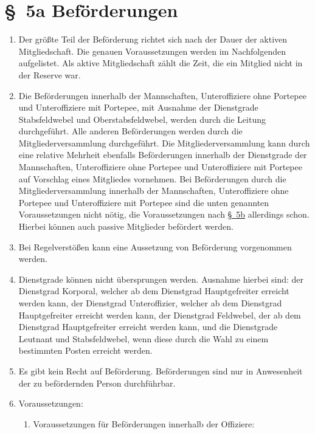 \newpage
\section*{\S~5a Beförderungen}
\label{sec:befroerderungen}
\begin{enumerate}[label=(\arabic*)]
    \item Der größte Teil der Beförderung richtet sich nach der Dauer der aktiven Mitgliedschaft. Die genauen Voraussetzungen werden im Nachfolgenden aufgelistet. Als aktive Mitgliedschaft zählt die Zeit, die ein Mitglied nicht in der Reserve war.    
    \item Die Beförderungen innerhalb der Mannschaften, Unteroffiziere ohne Portepee und Unteroffiziere mit Portepee, mit Ausnahme der Dienstgrade Stabsfeldwebel und Oberstabsfeldwebel, werden durch die Leitung durchgeführt. Alle anderen Beförderungen werden durch die Mitgliederversammlung durchgeführt. Die Mitgliederversammlung kann durch eine relative Mehrheit ebenfalls Beförderungen innerhalb der Dienstgrade der Mannschaften, Unteroffiziere ohne Portepee und Unteroffiziere mit Portepee auf Vorschlag eines Mitgliedes vornehmen. Bei Beförderungen durch die Mitgliederversammlung innerhalb der Mannschaften, Unteroffiziere ohne Portepee und Unteroffiziere mit Portepee sind die unten genannten Voraussetzungen nicht nötig, die Voraussetzungen nach \hyperref[sec:dienstgradschluessel]{\S~5b} allerdings schon. Hierbei können auch passive Mitglieder befördert werden.    
    \item Bei Regelverstößen kann eine Aussetzung von Beförderung vorgenommen werden.    
    \item Dienstgrade können nicht übersprungen werden. Ausnahme hierbei sind: der Dienstgrad Korporal, welcher ab dem Dienstgrad Hauptgefreiter erreicht werden kann, der Dienstgrad Unteroffizier, welcher ab dem Dienstgrad Hauptgefreiter erreicht werden kann, der Dienstgrad Feldwebel, der ab dem Dienstgrad Hauptgefreiter erreicht werden kann, und die Dienstgrade Leutnant und Stabsfeldwebel, wenn diese durch die Wahl zu einem bestimmten Posten erreicht werden.   
    \item Es gibt kein Recht auf Beförderung. Beförderungen sind nur in Anwesenheit der zu befördernden Person durchführbar.
    \item Voraussetzungen:
    \begin{enumerate}[label=(\Alph*)]
        \item Voraussetzungen für Beförderungen innerhalb der Offiziere:

\end{enumerate}
\end{enumerate}
